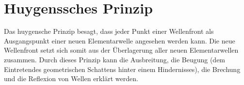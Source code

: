 \documentclass{article}
\begin{document}
\section{Huygenssches Prinzip} 
Das huygensche Prinzip besagt, dass jeder Punkt einer Wellenfront als Ausgangspunkt einer neuen Elementarwelle angesehen werden kann. Die neue Wellenfront setzt sich somit aus der Überlagerung aller neuen Elementarwellen zusammen. \newline
Durch dieses Prinzip kann die Ausbreitung, die Beugung (dem Eintretendes geometrischen Schattens hinter einem Hindernisses), die Brechung und die Reflexion von Wellen erklärt werden. 
\end{document}
